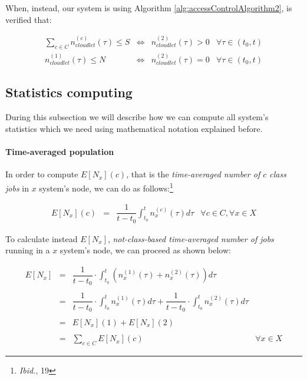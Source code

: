 \documentclass[10pt,a4paper]{article}
\begin{document}
When, instead, our system is using Algorithm \ref{alg:accessControlAlgorithm2}, is verified that:

\begin{equation}
\begin{array} {rccr} 
\displaystyle \sum_{c \in C} n_{cloudlet}^{(c)}(\tau) \leq S & \Leftrightarrow & n_{cloudlet}^{(2)}(\tau) > 0 & \forall \tau \in (t_0, t) \\
n_{cloudlet}^{(1)}(\tau) \leq N & \Leftrightarrow & n_{cloudlet}^{(2)}(\tau) = 0 & \forall \tau \in (t_0, t)
\end{array}
\end{equation}

\subsection{Statistics computing}

During this subsection we will describe how we can compute all system's statistics which we need using mathematical notation explained before.

\paragraph{Time-averaged population}

In order to compute $E[N_x](c)$, that is the \textit{time-averaged number of $c$ class jobs} in $x$ system's node, we can do as follows:\footnote{\textit{Ibid.}, 19}

\begin{equation}
\begin{array} {rclr} 
E[N_x](c) & = & \displaystyle  \dfrac{1}{t-t_0}\int_{t_0}^t n_x^{(c)}(\tau)d\tau & \forall c \in C, \forall x \in X
\end{array}
\end{equation}

To calculate instead $E[N_x]$, \textit{not-class-based time-averaged number of jobs} running in a $x$ system's node, we can proceed as shown below:

\begin{equation}
\begin{array} {rclr} 
E[N_x] & = & \displaystyle  \dfrac{1}{t-t_0} \cdot \int_{t_0}^t \left( n_x^{(1)}(\tau) + n_x^{(2)}(\tau) \right) d\tau \\\\
	   & = & \displaystyle  \dfrac{1}{t-t_0} \cdot \int_{t_0}^t n_x^{(1)}(\tau)d\tau + \dfrac{1}{t-t_0} \cdot \int_{t_0}^t n_x^{(2)}(\tau)d\tau \\\\
	   & = & E[N_x](1) + E[N_x](2) \\\\
	   & = & \displaystyle  \sum_{c \in C} E[N_x](c) & \forall x \in X
\end{array}
\end{equation}
\end{document}
